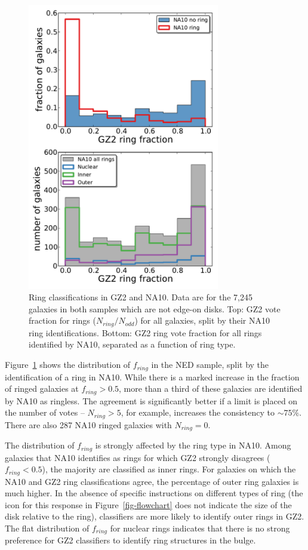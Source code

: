 \documentclass[useAMS,usenatbib]{mn2e}
\begin{document}
\begin{figure}
\includegraphics[angle=0,width=3.3in]{figures/na_gz2_rings.pdf}
\caption{Ring classifications in GZ2 and NA10. Data are for the 7,245 galaxies in both samples which are not edge-on disks. Top: GZ2 vote fraction for rings ($N_{ring}/N_{odd}$) for all galaxies, split by their NA10 ring identifications. Bottom: GZ2 ring vote fraction for all rings identified by NA10, separated as a function of ring type.
\label{fig-na_rings}}
\end{figure}

Figure~\ref{fig-na_rings} shows the distribution of $f_{ring}$ in the NED sample, split by the identification of a ring in NA10. While there is a marked increase in the fraction of ringed galaxies at $f_{ring}>0.5$, more than a third of these galaxies are identified by NA10 as ringless. The agreement is significantly better if a limit is placed on the number of votes -- $N_{ring} > 5$, for example, increases the consistency to $\sim75\%$. There are also 287 NA10 ringed galaxies with $N_{ring}=0$. 

The distribution of $f_{ring}$ is strongly affected by the ring type in NA10. Among galaxies that NA10 identifies as rings for which GZ2 strongly disagrees ($f_{ring}<0.5$), the majority are classified as inner rings. For galaxies on which the NA10 and GZ2 ring classifications agree, the percentage of outer ring galaxies is much higher. In the absence of specific instructions on different types of ring (the icon for this response in Figure~\ref{fig-flowchart} does not indicate the size of the disk relative to the ring), classifiers are more likely to identify outer rings in GZ2. The flat distribution of $f_{ring}$ for nuclear rings indicates that there is no strong preference for GZ2 classifiers to identify ring structures in the bulge. 
\end{document}
